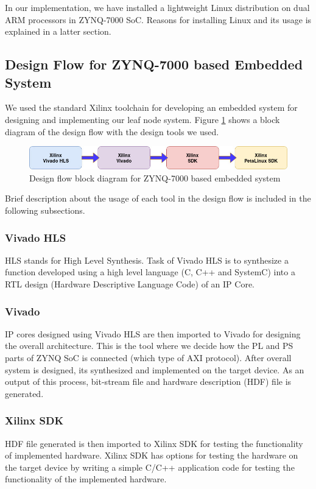 \documentclass[12pt,a4paper]{report}
\begin{document}
In our implementation, we have installed a lightweight Linux distribution on dual ARM processors in ZYNQ-7000 SoC. Reasons for installing Linux and its usage is explained in a latter section.


\subsection{Design Flow for ZYNQ-7000 based Embedded System}
We used the standard Xilinx toolchain for developing an embedded system for designing and implementing our leaf node system. Figure \ref{design} shows a block diagram of the design flow with the design tools we used.

\begin{figure}[H]
\includegraphics[width=13cm]{design.jpg}
\centering
\caption{Design flow block diagram for ZYNQ-7000 based embedded system}
\label{design}
\end{figure}

Brief description about the usage of each tool in the design flow is included in the following subsections.

\subsubsection{Vivado HLS}
HLS stands for High Level Synthesis. Task of Vivado HLS is to synthesize a function developed using a high level language (C, C++ and SystemC) into a RTL design (Hardware Descriptive Language Code) of an IP Core. 

\subsubsection{Vivado}
IP cores designed using Vivado HLS are then imported to Vivado for designing the overall architecture. This is the tool where we decide how the PL and PS parts of ZYNQ SoC is connected (which type of AXI protocol). After overall system is designed, its synthesized and implemented on the target device. As an output of this process, bit-stream file and hardware description (HDF) file is generated.

\subsubsection{Xilinx SDK}
HDF file generated is then imported to Xilinx SDK for testing the functionality of implemented hardware. Xilinx SDK has options for testing the hardware on the target device by writing a simple C/C++ application code for testing the functionality of the implemented hardware.
\end{document}
